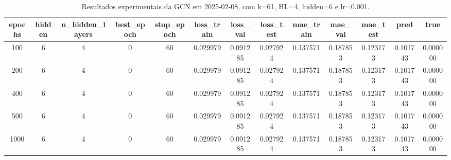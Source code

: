 \begin{table}[h]
\centering
\caption{Resultados experimentais da GCN em 2025-02-08, com k=61, HL=4, hidden=6 e lr=0.001.}
\label{tab:gcn_results_k61_hl4_h6_d20250208}
\begin{tabular}{ccccccccccccc}
\toprule
epochs & hidden & n\_hidden\_layers & best\_epoch & stop\_epoch & loss\_train & loss\_val & loss\_test & mae\_train & mae\_val & mae\_test & pred & true \\
\midrule
100 & 6 & 4 & 0 & 60 & 0.029979 & 0.091285 & 0.027924 & 0.137571 & 0.187853 & 0.123173 & 0.101743 & 0.000000 \\
200 & 6 & 4 & 0 & 60 & 0.029979 & 0.091285 & 0.027924 & 0.137571 & 0.187853 & 0.123173 & 0.101743 & 0.000000 \\
400 & 6 & 4 & 0 & 60 & 0.029979 & 0.091285 & 0.027924 & 0.137571 & 0.187853 & 0.123173 & 0.101743 & 0.000000 \\
500 & 6 & 4 & 0 & 60 & 0.029979 & 0.091285 & 0.027924 & 0.137571 & 0.187853 & 0.123173 & 0.101743 & 0.000000 \\
1000 & 6 & 4 & 0 & 60 & 0.029979 & 0.091285 & 0.027924 & 0.137571 & 0.187853 & 0.123173 & 0.101743 & 0.000000 \\
\bottomrule
\end{tabular}
\end{table}
